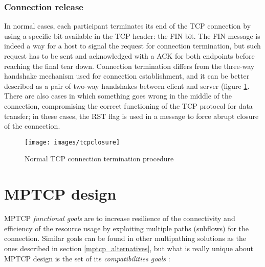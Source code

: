 \subsubsection{Connection release}
In normal cases, each participant terminates its end of the TCP connection by using a specific bit available in the TCP header: the FIN bit. The FIN message is indeed a way for a host to signal the request for connection termination, but such request has to be sent and acknowledged with a ACK for both endpoints before reaching the final tear down. Connection termination differs from the three-way handshake mechanism used for connection establishment, and it can be better described as a pair of two-way handshakes between client and server (figure \ref{fig:tcpclosure}.
There are also cases in which something goes wrong in the middle of the connection, compromising the correct functioning of the TCP protocol for data transfer; in these cases, the RST flag is used in a message to force abrupt closure of the connection.

\begin{figure}[!htb]
\centering
\texttt{[image: images/tcpclosure]}
\caption{Normal TCP connection termination procedure}
\label{fig:tcpclosure}
\end{figure}

\section{MPTCP design}
\label{mptcpdesign}
MPTCP \textit{functional goals} are to increase resilience of the connectivity and efficiency of the resource usage by exploiting multiple paths (subflows) for the connection.
Similar goals can be found in other multipathing solutions as the ones described in section \ref{mptcp_alternatives}, but what is really unique about MPTCP design is the set of its \textit{compatibilities goals} \cite{rfc6182}:

